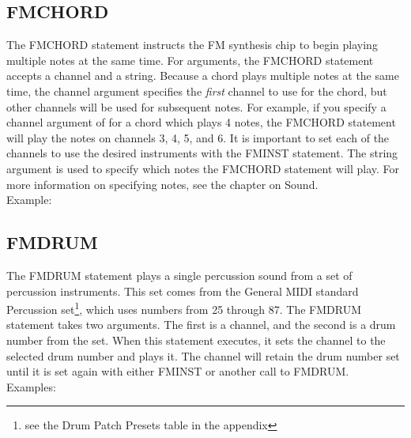 \subsection{FMCHORD}

The {\ttfamily FMCHORD} statement instructs the FM synthesis chip to begin
playing multiple notes at the same time.  For arguments, the {\ttfamily
FMCHORD} statement accepts a channel and a string.  Because a chord plays
multiple notes at the same time, the channel argument specifies the
\emph{first} channel to use for the chord, but other channels will be used for
subsequent notes.  For example, if you specify a channel argument of {} for a chord which plays 4 notes, the {\ttfamily FMCHORD} statement will play
the notes on channels 3, 4, 5, and 6.  It is important to set each of the
channels to use the desired instruments with the {\ttfamily FMINST} statement.
The string argument is used to specify which notes the {\ttfamily FMCHORD}
statement will play.  For more information on specifying notes, see the chapter
on Sound.\\

Example:\\


\subsection{FMDRUM}

The {\ttfamily FMDRUM} statement plays a single percussion sound from a set of
percussion instruments.  This set comes from the General MIDI standard
Percussion set\footnote{see the Drum Patch Presets table in the appendix},
which uses numbers from 25 through 87.  The {\ttfamily FMDRUM} statement takes
two arguments.  The first is a channel, and the second is a drum number from
the set.  When this statement executes, it sets the channel to the selected
drum number and plays it.  The channel will retain the drum number set until it
is set again with either {\ttfamily FMINST} or another call to {\ttfamily
FMDRUM}.\\

Examples:\\

